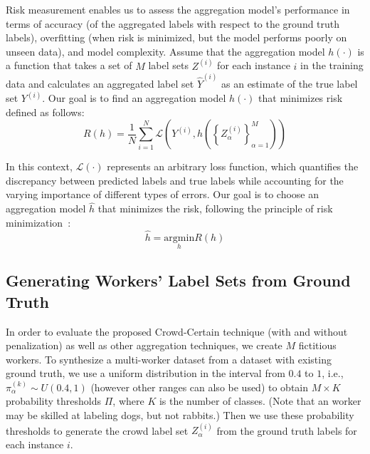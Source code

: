 Risk measurement enables us to assess the aggregation model's performance in terms of accuracy (of the aggregated labels with respect to the ground truth labels), overfitting (when risk is minimized, but the model performs poorly on unseen data), and model complexity.
Assume that the aggregation model $h (\cdot) $ is a function that takes a set of $M $ label sets $Z^{(i)} $ for each instance $i $ in the training data and calculates an aggregated label set $\widehat{Y}^{(i)} $ as an estimate of the true label set $Y^{(i)} $. Our goal is to find an aggregation model $h(\cdot) $ that minimizes risk defined as follows:
\begin{equation}
    R(h) = \frac{1}{N} \sum_{i=1}^{N} \mathcal{L} \left( Y^{(i)}, h\left({\left\{Z_{\alpha}^{(i)}\right\}}_{\alpha=1}^{M}\right)\right)
    \label{eq:crowd.Eq.2.risk.emp}
\end{equation}

In this context, $\mathcal{L}(\cdot) $ represents an arbitrary loss function, which quantifies the discrepancy between predicted labels and true labels while accounting for the varying importance of different types of errors.
Our goal is to choose an aggregation model $\widehat{h} $ that minimizes the risk, following the principle of risk minimization~\cite{vapnik_Principles_1991}:
\begin{equation}
    \widehat{h} = \underset{h}{\text{argmin}}  R(h)
    \label{eq:crowd.Eq.3.risk.h}
\end{equation}

\subsection{Generating Workers' Label Sets from Ground Truth}\label{subsec:methods.generating_fictitious_labelset}


In order to evaluate the proposed Crowd-Certain technique (with and without penalization) as well as other aggregation techniques, we create $M$ fictitious workers. To synthesize a multi-worker dataset from a dataset with existing ground truth, we use a uniform distribution in the interval from $0.4 $ to $1 $, i.e., $\pi_\alpha^{(k)} \sim U\left(0.4,1\right) $ (however other ranges can also be used) to obtain $M \times  K$ probability thresholds $\Pi $, where $K$ is the number of classes. (Note that
an worker may be skilled at labeling dogs, but not rabbits.) Then we use these probability thresholds to generate the crowd label set $Z_{\alpha}^{(i)} $ from the ground truth labels for each instance $i $.

